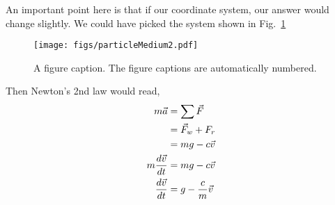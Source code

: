 \begin{enumerate}[label = \bfseries (\alph*)]
An important point here is that if our coordinate system, our answer would change slightly. We could have picked the system shown in Fig.~\ref{2015:q5:fig:particle2}
\begin{figure}
\begin{center}
\texttt{[image: figs/particleMedium2.pdf]}
\caption{\label{2015:q5:fig:particle2} A figure caption. The figure captions are
automatically numbered.}
\end{center}
\end{figure}
Then Newton's 2nd law would read,
\begin{align}
   m \vec{a} &= \sum \vec{F} \nonumber\\
   &= \vec{F}_w + F_r \nonumber \\
   &= m g - c \vec{v} \nonumber \\
   m \frac{d\vec{v}}{dt} &= mg - c \vec{v} \nonumber \\
   \frac{d\vec{v}}{dt} &= g - \frac{c}{m} \vec{v} 
\end{align}


\end{enumerate}


